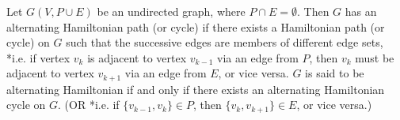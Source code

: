 \documentclass{llncs}
\begin{document}
\begin{definition}
	Let $G(V,P\cup E)$ be an undirected graph, where $P \cap E = \emptyset$. Then $G$ has an alternating Hamiltonian path (or cycle) if there exists a Hamiltonian path (or cycle) on $G$ such that the successive edges are members of different edge sets, *i.e. if vertex $v_k$ is adjacent to vertex $v_{k-1}$ via an edge from $P$, then $v_k$ must be adjacent to vertex $v_{k+1}$ via an edge from $E$, or vice versa. $G$ is said to be alternating Hamiltonian if and only if there exists an alternating Hamiltonian cycle on $G$. (OR *i.e. if $\{v_{k-1}, v_k\} \in P$, then $\{v_k, v_{k+1}\} \in E$, or vice versa.)
\end{definition}
\end{document}
